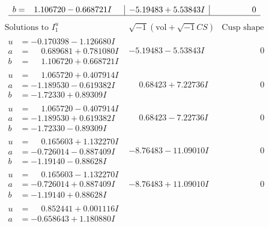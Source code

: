 \documentclass[1p]{elsarticle_modified}
\theoremstyle{definition}
\newcommand{\I}{\sqrt{-1}}
\begin{document}
$$\begin{array}{c|c|c}
\begin{aligned}
b &= \phantom{-}1.106720 - 0.668721 I\end{aligned}
 & -5.19483 + 5.53843 I & \phantom{-0.000000 } 0\\
 \hline 
 \end{array}$$\newpage$$\begin{array}{c|c|c}  
\text{Solutions to }I^u_{1}& \I (\text{vol} + \sqrt{-1}CS) & \text{Cusp shape}\\
 \hline 
\begin{aligned}
u &= -0.170398 - 1.126680 I \\
a &= \phantom{-}0.689681 + 0.781080 I \\
b &= \phantom{-}1.106720 + 0.668721 I\end{aligned}
 & -5.19483 - 5.53843 I & \phantom{-0.000000 } 0 \\ \hline\begin{aligned}
u &= \phantom{-}1.065720 + 0.407914 I \\
a &= -1.189530 - 0.619382 I \\
b &= -1.72330 + 0.89309 I\end{aligned}
 & \phantom{-}0.68423 + 7.22736 I & \phantom{-0.000000 } 0 \\ \hline\begin{aligned}
u &= \phantom{-}1.065720 - 0.407914 I \\
a &= -1.189530 + 0.619382 I \\
b &= -1.72330 - 0.89309 I\end{aligned}
 & \phantom{-}0.68423 - 7.22736 I & \phantom{-0.000000 } 0 \\ \hline\begin{aligned}
u &= \phantom{-}0.165603 + 1.132270 I \\
a &= -0.726014 - 0.887409 I \\
b &= -1.19140 - 0.88628 I\end{aligned}
 & -8.76483 - 11.09010 I & \phantom{-0.000000 } 0 \\ \hline\begin{aligned}
u &= \phantom{-}0.165603 - 1.132270 I \\
a &= -0.726014 + 0.887409 I \\
b &= -1.19140 + 0.88628 I\end{aligned}
 & -8.76483 + 11.09010 I & \phantom{-0.000000 } 0 \\ \hline\begin{aligned}
u &= \phantom{-}0.852441 + 0.001116 I \\
a &= -0.658643 + 1.180880 I \\

\end{aligned}
\end{array}$$
\end{document}
